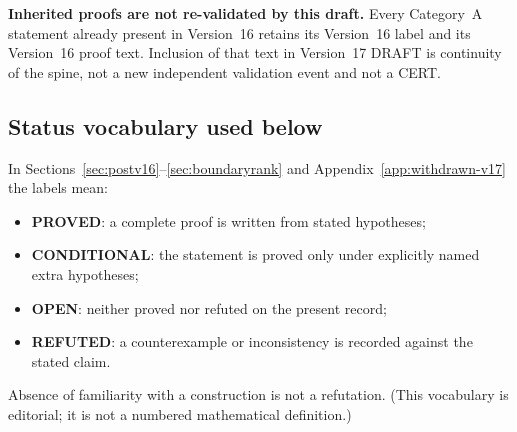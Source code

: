 \noindent\textbf{Inherited proofs are not re-validated by this draft.}
Every Category~A statement already present in Version~16 retains its Version~16 label and its Version~16 proof text. Inclusion of that text in Version~17 DRAFT is continuity of the spine, not a new independent validation event and not a CERT.

\subsection{Status vocabulary used below}
\noindent In Sections~\ref{sec:postv16}--\ref{sec:boundaryrank} and Appendix~\ref{app:withdrawn-v17} the labels mean:
\begin{itemize}
\item \textbf{PROVED}: a complete proof is written from stated hypotheses;
\item \textbf{CONDITIONAL}: the statement is proved only under explicitly named extra hypotheses;
\item \textbf{OPEN}: neither proved nor refuted on the present record;
\item \textbf{REFUTED}: a counterexample or inconsistency is recorded against the stated claim.
\end{itemize}
Absence of familiarity with a construction is not a refutation. (This vocabulary is editorial; it is not a numbered mathematical definition.)
